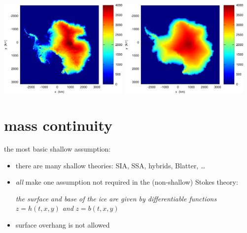 \documentclass[titlepage,letterpaper,final,12pt]{scrartcl}
\begin{document}
\includegraphics[width=2.5in]{antinitial}
\quad
\includegraphics[width=2.5in]{antfinal}





\section{mass continuity}

the most basic shallow assumption:

\begin{itemize}
\item there are many shallow theories: SIA, SSA, hybrids, Blatter, \dots \nocite{Blatter}
\item \emph{all} make one assumption not required in the (non-shallow) Stokes theory:

\begin{center}
\emph{the surface and base of the ice are given by differentiable functions} $z=h(t,x,y)$ \emph{and} $z=b(t,x,y)$
\end{center}
\item surface overhang is not allowed
\end{itemize}
\end{document}

